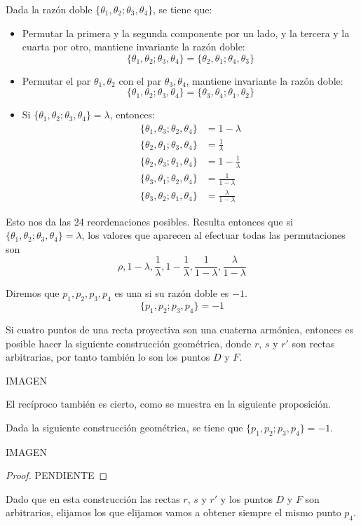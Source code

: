 Dada la razón doble $\{\theta_1,\theta_2;\theta_3,\theta_4\}$, se tiene que:
\begin{itemize}
	\item Permutar la primera y la segunda componente por un lado, y la tercera y la cuarta por otro, mantiene invariante la razón doble: \[\{\theta_1,\theta_2;\theta_3,\theta_4\}=\{\theta_2,\theta_1;\theta_4,\theta_3\}\]
	
	\item Permutar el par $\theta_1,\theta_2$ con el par $\theta_3,\theta_4$, mantiene invariante la razón doble: \[\{\theta_1,\theta_2;\theta_3,\theta_4\}=\{\theta_3,\theta_4;\theta_1,\theta_2\}\]
	
	\item Si $\{\theta_1,\theta_2;\theta_3,\theta_4\}=\lambda$, entonces:
	\begin{equation*}
		\begin{split}
			\{\theta_1,\theta_3;\theta_2,\theta_4\}&=1-\lambda\\
			\{\theta_2,\theta_1;\theta_3,\theta_4\}&=\frac{1}{\lambda}\\
			\{\theta_2,\theta_3;\theta_1,\theta_4\}&=1-\frac{1}{\lambda}\\
			\{\theta_3,\theta_1;\theta_2,\theta_4\}&=\frac{1}{1-\lambda}\\
			\{\theta_3,\theta_2;\theta_1,\theta_4\}&=\frac{\lambda}{1-\lambda}
		\end{split}
	\end{equation*}
\end{itemize}
Esto nos da las 24 reordenaciones posibles. Resulta entonces que si $\{\theta_1,\theta_2;\theta_3,\theta_4\}=\lambda$, los valores que aparecen al efectuar todas las permutaciones son 
\[\rho,1-\lambda,\frac{1}{\lambda},1-\frac{1}{\lambda},\frac{1}{1-\lambda},\frac{\lambda}{1-\lambda}\]
\begin{defi}
	Diremos que $p_1,p_2,p_3,p_4$ es una  si su razón doble es $-1$.
	\begin{equation}
		\{p_1,p_2;p_3,p_4\}=-1
	\end{equation}
\end{defi}
Si cuatro puntos de una recta proyectiva son una cuaterna armónica, entonces es posible hacer la siguiente construcción geométrica, donde $r$, $s$ y $r'$ son rectas arbitrarias, por tanto también lo son los puntos $D$ y $F$.

IMAGEN

El recíproco también es cierto, como se muestra en la siguiente proposición.
\begin{prop}
	Dada la siguiente construcción geométrica, se tiene que $\{p_1,p_2;p_3,p_4\}=-1$.
	
	IMAGEN
\end{prop}
\begin{proof}
	PENDIENTE
\end{proof}
Dado que en esta construcción las rectas $r$, $s$ y $r'$ y los puntos $D$ y $F$ son arbitrarios, elijamos los que elijamos vamos a obtener siempre el mismo punto $p_4$. 

